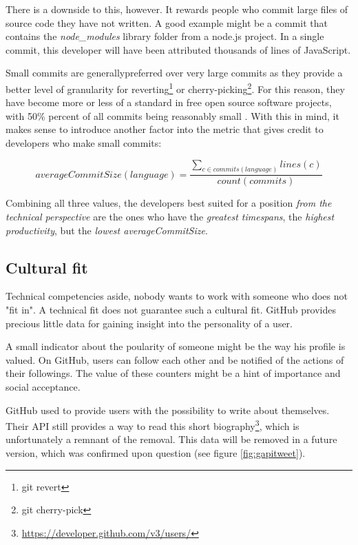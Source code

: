 There is a downside to this, however. It rewards people who commit
large files of source code they have not written. A good example might be
a commit that contains the \textit{node\_modules} library folder from a
node.js project. In a single commit, this developer will have been
attributed thousands of lines of JavaScript.

Small commits are generallypreferred \cite{so:commitsize}
over very large commits as they provide a better level of granularity for
reverting\footnote{git revert} or cherry-picking\footnote{git cherry-pick}.
For this reason, they have become more or less of a standard in
free open source software projects, with 50\% percent of all commits
being reasonably small \cite{rsk:2014}.
With this in mind, it makes sense to introduce another factor into
the metric that gives credit to developers who make small commits:

\begin{equation}
averageCommitSize(language) = \frac{\sum_{c \in commits(language)} lines(c)}{count(commits)}
\label {eq:avgcommitsize}
\end{equation}

Combining all three values, the developers best suited for a position
\textit{from the technical perspective} are the ones who
have the \textit{greatest timespans}, the \textit{highest productivity},
but the \textit{lowest averageCommitSize}.

\subsection{Cultural fit}
Technical competencies aside, nobody wants to work with someone who does
not "fit in". A technical fit does not guarantee such a cultural fit.
GitHub provides precious little data for gaining insight into the
personality of a user.
\newline

A small indicator about the poularity of someone might be the way
his profile is valued. On GitHub, users can follow each other and be
notified of the actions of their followings. The value of these counters
might be a hint of importance and social acceptance.
\newline

GitHub used to provide users with the possibility to write about themselves.
Their API still provides a way to read this short biography\footnote{\url{https://developer.github.com/v3/users/}}, which is unfortunately a
remnant of the removal. This data will be removed in a future version,
which was confirmed upon question (see figure \ref{fig:gapitweet}).

